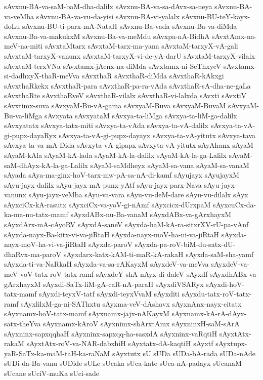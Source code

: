 {sAvxnu-BA-va-saM-baM-dha-dalilx
sAvxnu-BA-va-sa-dAvx-sa-neya
sAvxnu-BA-va-veMba
sAvxnu-BA-va-vu-da-yisi
sAvxnu-BA-vi-yalalx
sAvxnu-BU-teY-kayx-doLu
sAvxnu-BU-ti-parx-mA-NataH
sAvxnu-Ba-vada
sAvxnu-Ba-va-diMda
sAvxnu-Ba-va-makukxM
sAvxnu-Ba-va-meMdu
sAvxpa-nA-BidhA
sAvxtAmx-na-meV-na-miti
sAvxtaMtarx
sAvxtaM-tarx-ma-yana
sAvxtaM-tarxyX-vA-gali
sAvxtaM-tarxyX-vanunx
sAvxtaM-tarxyX-vi-de-yA-darU
sAvxtaM-tarxyX-vilalx
sAvxtaM-terxVNa
sAvxtamx-jAcnx-na-diMda
sAvxtamx-ni-SeThxyeV
sAvxtamx-si-dadhxyX-thaR-meVva
sAvxthaR
sAvxthaR-diMda
sAvxthaR-kAkxgi
sAvxthaRkekx
sAvxthaR-para
sAvxthaR-pa-ra-vAda
sAvxthaR-sA-dha-ne-gaLa
sAvxthaRte
sAvxthaRveV
sAvxthaR-vilalx
sAvxthaR-vi-lalxda
sAvxti
sAvxtiV
sAvxtimx-suva
sAvxyaM-Bu-vA-gama
sAvxyaM-Buva
sAvxyaM-BuvaM
sAvxyaM-Bu-va-liMga
sAvxyata
sAvxyataM
sAvxya-ta-liMga
sAvxya-ta-liM-ga-dalilx
sAvxyatatx
sAvxya-tatx-miti
sAvxya-ta-vAda
sAvxya-ta-vA-dalilx
sAvxya-ta-vA-gi-pupx-dayaRyx
sAvxya-ta-vA-gi-pupx-dayayx
sAvxya-ta-vA-yitutx
sAvxya-tava
sAvxya-ta-va-mA-Dida
sAvxyta-vA-gipapx
sAvxyta-vA-yitutx
sAyAhanx
sAyaM
sAyaM-kAla
sAyaM-kA-lada
sAyaM-kA-la-dalilx
sAyaM-kA-la-ga-Lalilx
sAyaM-saM-dhAyx-kA-la-ga-Lalilx
sAyaM-saMdheyx
sAyaM-sa-vana
sAyaM-sa-vanaM
sAyada
sAya-ma-ginx-hoV-tarx-mw-pA-sa-nA-di-kamf
sAyujayx
sAyujayxM
sAyu-jayx-dalilx
sAyu-jayx-mA-punx-yAtf
sAyu-jayx-parx-Nava
sAyu-jayx-vanunx
sAyu-jayx-veMba
sAyu-va-vara
sAyu-vu-deM-dare
sAyu-vu-dilalx
sAyx
sAyxciCx-kA-rasutx
sAyxciCx-va-yoV-gi-nAmf
sAyxcicx-dUrxpaM
sAyxcuCx-da-ka-ma-nu-tatx-mamf
sAyxdABx-nu-Ba-vanaM
sAyxdABx-va-gArxhayxM
sAyxdArx-mA-cAyoRV
sAyxdA-saneV
sAyxda-haM-kA-ra-sitxrXV-rU-pa-vAnf
sAyxda-nayx-Ba-kitx-vi-va-jiRtaH
sAyxda-nayx-moV-ha-ni-va-jiRtaH
sAyxda-nayx-moV-ha-vi-va-jiRtaH
sAyxda-paroV
sAyxda-pa-roV-biM-du-satx-dU-dhaRvx-ma-paroV
sAyxdarx-katx-kAM-ti-maR-kA-rakaH
sAyxda-saM-sha-yamf
sAyxda-ti-va-NaRkaH
sAyxda-va-sa-rAKayxM
sAyxdeV-va-meVva
sAyxdeV-va-meV-voV-tatx-roV-tatx-ramf
sAyxdeY-shA-nAyx-di-daleV
sAyxdf
sAyxdhABx-va-gArxhayxM
sAyxdi-SaTx-liM-gA-caR-nA-paraH
sAyxdiVSARyx
sAyxdi-hoV-tatx-mamf
sAyxdi-teyxV-tatf
sAyxdi-teyxVvaM
sAyxditi
sAyxdu-tatx-roV-tatx-ramf
sAyxlilxM-ga-ni-SAThxtu
sAyxma-veV-dAshavx
sAyxnAnx-nayx-citatx
sAyxnamx-hoV-tatx-mamf
sAyxnamx-jajx-nAKayxM
sAyxnamx-kA-rA-dAyx-satx-theYva
sAyxnamx-kAroV
sAyxnimx-shArxtAmx
sAyxninxH-saM-sArA
sAyxninx-sapxqqhaH
sAyxninx-sapxqq-ha-sasxdA
sAyxninx-vaRqtiH
sAyxtAtx-rakaM
sAyxtAtx-roV-va-NAR-dabxhiH
sAyxtatx-dA-kaqtiH
sAyxtf
sAyxtupx-yaR-SaTx-ka-maM-taH-ka-raNaM
sAyxtutx
sU
sUDa
sUDa-bA-rada
sUDa-nAde
sUDi-da-Ba-vanu
sUDide
sULe
sUcaka
sUca-kate
sUca-nA-padayx
sUcanaM
sUcane
sUciV-muKa
sUci-sade
}
